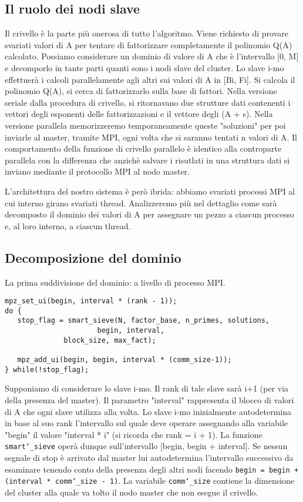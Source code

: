 \subsection{Il ruolo dei nodi slave}
Il crivello è la parte più onerosa di tutto l'algoritmo. Viene
richiesto di provare svariati valori di A per tentare di fattorizzare
completamente il polinomio Q(A) calcolato. Possiamo considerare un
dominio di valore di A che è l'intervallo [0, M] e decomporlo in
tante parti quanti sono i nodi slave del cluster. Lo slave i-mo
effettuerà i calcoli parallelamente agli altri sui valori di A in [Bi, Fi].
Si calcola il polinomio Q(A), si cerca di fattorizzarlo sulla base di
fattori. Nella versione seriale dalla procedura di crivello, si
ritornavano due strutture dati contenenti i vettori degli esponenti
delle fattorizzazioni e il vettore degli (A + s). Nella versione
parallela memorizzeremo temporaneamente queste "soluzioni" per poi
inviarle al master, tramite MPI, ogni volta che si saranno tentati n valori
di A. Il comportamento della funzione di crivello parallelo è identico
alla controparte parallela con la differenza che anzichè salvare i risutlati
in una struttura dati si inviano mediante il protocollo MPI al nodo master.

L'architettura del nostro sistema è però ibrida: abbiamo svariati
processi MPI al cui interno girano svariati thread. Analizzeremo più nel
dettaglio come sarà decomposto il dominio dei valori di A per
assegnare un pezzo a ciascun processo e, al loro interno, a ciascun
thread.
\subsection{Decomposizione del dominio}
La prima suddivisione del dominio: a livello di processo MPI.
\begin{lstlisting}
mpz_set_ui(begin, interval * (rank - 1));
do {
   stop_flag = smart_sieve(N, factor_base, n_primes, solutions,
                	  begin, interval,
		  	  block_size, max_fact);

   mpz_add_ui(begin, begin, interval * (comm_size-1));
} while(!stop_flag);
\end{lstlisting}
Supponiamo di considerare lo slave i-mo. Il rank di tale slave sarà
i+1 (per via della presenza del master). Il parametro "interval"
rappresenta il blocco di valori di A che ogni slave utilizza alla
volta. Lo slave i-mo inizialmente autodetermina in base al suo
rank l'intervallo sul quale deve operare assegnando alla variabile
"begin" il valore "interval * i" (si ricorda che rank = i + 1).
La funzione \texttt{smart\char`_sieve} operà dunque sull'intervallo [begin, begin +
  interval]. Se nessun segnale di stop è arrivato dal master lui
autodetermina l'intervallo successivo da esaminare tenendo conto della
presenza degli altri nodi facendo \texttt{begin = begin + (interval *
comm\char`_size - 1)}. La variabile \texttt{comm\char`_size} contiene la dimensione del
cluster alla quale va tolto il nodo master che non esegue il crivello.

